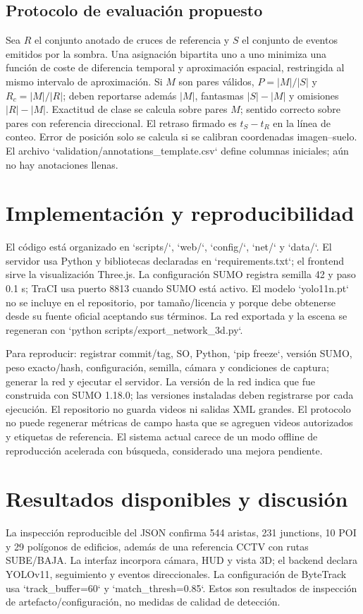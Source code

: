 \documentclass[conference]{IEEEtran}
\begin{document}
\subsection{Protocolo de evaluación propuesto}
Sea $R$ el conjunto anotado de cruces de referencia y $S$ el conjunto de eventos emitidos por la sombra. Una asignación bipartita uno a uno minimiza una función de coste de diferencia temporal y aproximación espacial, restringida al mismo intervalo de aproximación. Si $M$ son pares válidos, $P=|M|/|S|$ y $R_c=|M|/|R|$; deben reportarse además $|M|$, fantasmas $|S|-|M|$ y omisiones $|R|-|M|$. Exactitud de clase se calcula sobre pares $M$; sentido correcto sobre pares con referencia direccional. El retraso firmado es $t_S-t_R$ en la línea de conteo. Error de posición solo se calcula si se calibran coordenadas imagen--suelo. El archivo `validation/annotations_template.csv` define columnas iniciales; aún no hay anotaciones llenas.

\section{Implementación y reproducibilidad}
El código está organizado en `scripts/`, `web/`, `config/`, `net/` y `data/`. El servidor usa Python y bibliotecas declaradas en `requirements.txt`; el frontend sirve la visualización Three.js. La configuración SUMO registra semilla 42 y paso 0.1 s; TraCI usa puerto 8813 cuando SUMO está activo. El modelo `yolo11n.pt` no se incluye en el repositorio, por tamaño/licencia y porque debe obtenerse desde su fuente oficial aceptando sus términos. La red exportada y la escena se regeneran con `python scripts/export_network_3d.py`.

Para reproducir: registrar commit/tag, SO, Python, `pip freeze`, versión SUMO, peso exacto/hash, configuración, semilla, cámara y condiciones de captura; generar la red y ejecutar el servidor. La versión de la red indica que fue construida con SUMO 1.18.0; las versiones instaladas deben registrarse por cada ejecución. El repositorio no guarda videos ni salidas XML grandes. El protocolo no puede regenerar métricas de campo hasta que se agreguen videos autorizados y etiquetas de referencia. El sistema actual carece de un modo offline de reproducción acelerada con búsqueda, considerado una mejora pendiente.

\section{Resultados disponibles y discusión}
La inspección reproducible del JSON confirma 544 aristas, 231 junctions, 10 POI y 29 polígonos de edificios, además de una referencia CCTV con rutas SUBE/BAJA. La interfaz incorpora cámara, HUD y vista 3D; el backend declara YOLOv11, seguimiento y eventos direccionales. La configuración de ByteTrack usa `track_buffer=60` y `match_thresh=0.85`. Estos son resultados de inspección de artefacto/configuración, no medidas de calidad de detección.
\end{document}
